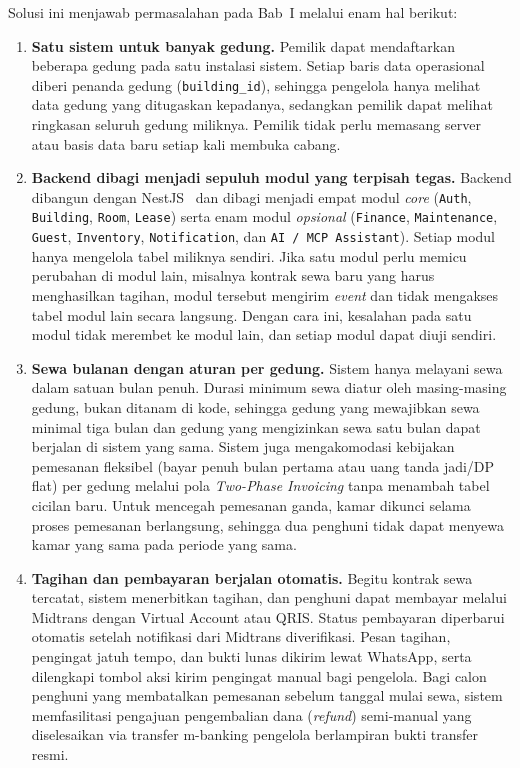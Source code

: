 Solusi ini menjawab permasalahan pada Bab~I melalui enam hal berikut:
\begin{enumerate}[label=\arabic*., leftmargin=*]
  \item \textbf{Satu sistem untuk banyak gedung.} Pemilik dapat mendaftarkan beberapa gedung pada satu instalasi sistem. Setiap baris data operasional diberi penanda gedung (\texttt{building\_id}), sehingga pengelola hanya melihat data gedung yang ditugaskan kepadanya, sedangkan pemilik dapat melihat ringkasan seluruh gedung miliknya. Pemilik tidak perlu memasang server atau basis data baru setiap kali membuka cabang.
  \item \textbf{Backend dibagi menjadi sepuluh modul yang terpisah tegas.} Backend dibangun dengan NestJS~\cite{nestjs2025} dan dibagi menjadi empat modul \textit{core} (\texttt{Auth}, \texttt{Building}, \texttt{Room}, \texttt{Lease}) serta enam modul \textit{opsional} (\texttt{Finance}, \texttt{Maintenance}, \texttt{Guest}, \texttt{Inventory}, \texttt{Notification}, dan \texttt{AI / MCP Assistant}). Setiap modul hanya mengelola tabel miliknya sendiri. Jika satu modul perlu memicu perubahan di modul lain, misalnya kontrak sewa baru yang harus menghasilkan tagihan, modul tersebut mengirim \textit{event} dan tidak mengakses tabel modul lain secara langsung. Dengan cara ini, kesalahan pada satu modul tidak merembet ke modul lain, dan setiap modul dapat diuji sendiri.
  \item \textbf{Sewa bulanan dengan aturan per gedung.} Sistem hanya melayani sewa dalam satuan bulan penuh. Durasi minimum sewa diatur oleh masing-masing gedung, bukan ditanam di kode, sehingga gedung yang mewajibkan sewa minimal tiga bulan dan gedung yang mengizinkan sewa satu bulan dapat berjalan di sistem yang sama. Sistem juga mengakomodasi kebijakan pemesanan fleksibel (bayar penuh bulan pertama atau uang tanda jadi/DP flat) per gedung melalui pola \textit{Two-Phase Invoicing} tanpa menambah tabel cicilan baru. Untuk mencegah pemesanan ganda, kamar dikunci selama proses pemesanan berlangsung, sehingga dua penghuni tidak dapat menyewa kamar yang sama pada periode yang sama.
  \item \textbf{Tagihan dan pembayaran berjalan otomatis.} Begitu kontrak sewa tercatat, sistem menerbitkan tagihan, dan penghuni dapat membayar melalui Midtrans dengan Virtual Account atau QRIS. Status pembayaran diperbarui otomatis setelah notifikasi dari Midtrans diverifikasi. Pesan tagihan, pengingat jatuh tempo, dan bukti lunas dikirim lewat WhatsApp, serta dilengkapi tombol aksi kirim pengingat manual bagi pengelola. Bagi calon penghuni yang membatalkan pemesanan sebelum tanggal mulai sewa, sistem memfasilitasi pengajuan pengembalian dana (\textit{refund}) semi-manual yang diselesaikan via transfer m-banking pengelola berlampiran bukti transfer resmi.

\end{enumerate}
